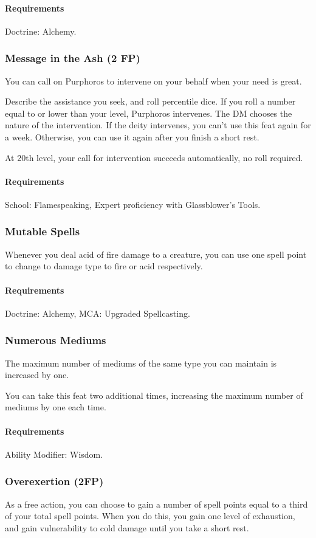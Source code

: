     \paragraph{Requirements} Doctrine: Alchemy.
\subsubsection{Message in the Ash (2 FP)} \label{feat::messageintheash}
    You can call on Purphoros to intervene on your behalf when your need is great.

    Describe the assistance you seek, and roll percentile dice.
    If you roll a number equal to or lower than your level, Purphoros intervenes.
    The DM chooses the nature of the intervention.
    If the deity intervenes, you can't use this feat again for a week.
    Otherwise, you can use it again after you finish a short rest.

    At 20th level, your call for intervention succeeds automatically, no roll required.
    \paragraph{Requirements} School: Flamespeaking, Expert proficiency with Glassblower's Tools.
\subsubsection{Mutable Spells} \label{feat::mutablespells}
    Whenever you deal acid of fire damage to a creature, you can use one spell point to change to damage type to fire or acid respectively.
    \paragraph{Requirements} Doctrine: Alchemy, MCA: Upgraded Spellcasting.
\subsubsection{Numerous Mediums} \label{feat::numerousmediums}
    The maximum number of mediums of the same type you can maintain is increased by one.

    You can take this feat two additional times, increasing the maximum number of mediums by one each time.
    \paragraph{Requirements} Ability Modifier: Wisdom.
\subsubsection{Overexertion (2FP)} \label{feat::overexertion}
    As a free action, you can choose to gain a number of spell points equal to a third of your total spell points.
    When you do this, you gain one level of exhaustion, and gain vulnerability to cold damage until you take a short rest.
